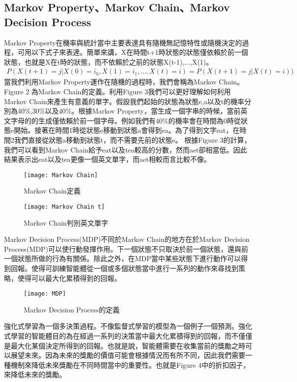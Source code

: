\documentclass[a4paper,12pt]{article}
\begin{document}
\subsection{Markov Property、Markov Chain、Markov Decision Process}
\quad Markov Property在機率與統計當中主要表達具有隨機無記憶特性或隨機決定的過程，可用以下式子來表達。簡單來講，X在時間t+1時狀態的狀態僅依賴於前一個狀態，也就是X在t時的狀態，而不依賴於之前的狀態X(t-1),...,X(1)。
\begin{align}
P(X(t+1)=j|X(0)=i_{0},X(1)=i_{1},...,X(t)=i)=P(X(t+1)=j|X(t)=i))\nonumber
\end{align}
\quad 當我們利用Markov Property運作在隨機的過程時，我們會稱為Markov Chain。Figure 2 為Markov Chain的定義。利用Figure 3我們可以更好理解如何利用Markov Chain來產生有意義的單字。假設我們起始的狀態為狀態e,a以及t的機率分別為40\%,30\%以及40\%。根據Markov Property，當生成一個字串的時候，當前英文字母的的生成僅依賴於前一個字母。例如我們有40\%的機率會在時間為0時從狀態e開始。接著在時間1時從狀態e移動到狀態a會得到ea。為了得到文字eat，在時間2我們直接從狀態a移動到狀態t，而不需要先前的狀態e。
根據Figure 3的計算，我們可以看到Markov Chain給予eat以及tea較高的分數，然而aet卻相當低。因此結果表示出eat以及tea更像一個英文單字，而aet相較而言比較不像。
\begin{figure*}[htb]
\hspace*{2cm}\texttt{[image: Markov Chain]}
\caption{Markov Chain定義}
\end{figure*}
\begin{figure*}[htb]
\hspace*{2cm}\texttt{[image: Markov Chain t]}
\caption{Markov Chain判別英文單字}
\end{figure*}
\quad Markov Decision Process(MDP)不同於Markov Chain的地方在於Markov Decision Process(MDP)可以使行動發揮作用。下一個狀態不只取決於前一個狀態，還與前一個狀態所做的行為有關係。除此之外，在MDP當中某些狀態下進行動作可以得到回報。使得可訓練智能體從一個或多個狀態當中進行一系列的動作來尋找到策略，使得可以最大化累積得到的回報。
\begin{figure*}[htb]
\hspace*{2cm}\texttt{[image: MDP]}
\caption{Markov Decision Process的定義}
\end{figure*}
\quad 強化式學習為一個多決策過程。不像監督式學習的模型為一個例子一個預測。強化式學習的智能體目的為在經過一系列的決策當中最大化累積得到的回報，而不僅僅是最大化某個決定所得到的回報。也就是說，智能體需要在收集當前的獎勵之時可以展望未來。因為未來的獎勵的價值可能會根據情況而有所不同，因此我們需要一種機制來降低未來獎勵在不同時間當中的重要性。也就是Figure 4中的折扣因子，來降低未來的獎勵。
\end{document}
